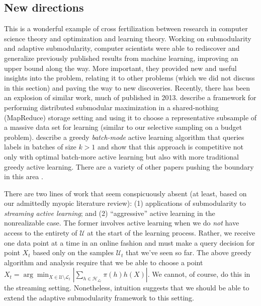 \subsection{New directions}

\noindent This is a wonderful example of cross fertilization between research in computer science theory and optimization and learning theory. Working on submodularity and adaptive submodularity, computer scientists were able to rediscover and generalize previously published results from machine learning, improving an upper bound along the way. More important, they provided new and useful insights into the problem, relating it to other problems (which we did not discuss in this section) and paving the way to new discoveries. Recently, there has been an explosion of similar work, much of published in 2013. \cite{mirzasoleiman13distributed} describe a framework for performing distributed submodular maximization in a shared-nothing (MapReduce) storage setting and using it to choose a representative subsample of a massive data set for learning (similar to our selective sampling on a budget problem). \cite{chen13near} describe a greedy \textit{batch-mode} active learning algorithm that queries labels in batches of size $k > 1$ and show that this approach is competitive not only with optimal batch-more active learning but also with more traditional greedy active learning. There are a variety of other papers pushing the boundary in this area \cite{GolovinK11} \cite{golovin10near} \cite{zuluaga13active} \cite{hollinger:2011}.

There are two lines of work that seem conspicuously absent (at least, based on our admittedly myopic literature review): (1) applications of submodularity to \textit{streaming active learning}; and (2) ``aggressive'' active learning in the nonrealizable case. The former involves active learning when we do \textit{not} have access to the entirety of $\mathcal{U}$ at the start of the learning process. Rather, we receive one data point at a time in an online fashion and must make a query decision for point $X_t$ based only on the samples $\mathcal{U}_t$ that we've seen so far. The above greedy algorithm and analysis require that we be able to choose a point $X_t = \arg\min_{X \in \mathcal{U} \setminus \mathcal{L}_t} \left| \sum_{h \in \mathcal{H}_{\mathcal{L}_t}} \pi(h) h(X) \right|$. We cannot, of course, do this in the streaming setting. Nonetheless, intuition suggests that we should be able to extend the adaptive submodularity framework to this setting.

